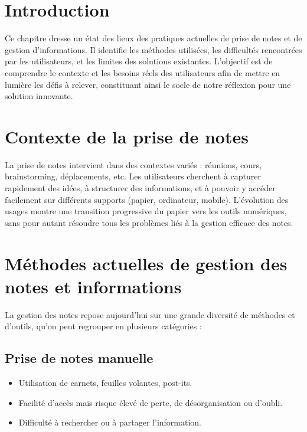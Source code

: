 
\section*{Introduction}
Ce chapitre dresse un état des lieux des pratiques actuelles de prise de notes et de gestion d’informations. Il identifie les méthodes utilisées, les difficultés rencontrées par les utilisateurs, et les limites des solutions existantes. L’objectif est de comprendre le contexte et les besoins réels des utilisateurs afin de mettre en lumière les défis à relever, constituant ainsi le socle de notre réflexion pour une solution innovante.

\section{Contexte de la prise de notes}

La prise de notes intervient dans des contextes variés : réunions, cours, brainstorming, déplacements, etc. Les utilisateurs cherchent à capturer rapidement des idées, à structurer des informations, et à pouvoir y accéder facilement sur différents supports (papier, ordinateur, mobile). L’évolution des usages montre une transition progressive du papier vers les outils numériques, sans pour autant résoudre tous les problèmes liés à la gestion efficace des notes.

\section{Méthodes actuelles de gestion des notes et informations}

La gestion des notes repose aujourd’hui sur une grande diversité de méthodes et d’outils, qu’on peut regrouper en plusieurs catégories :

\subsection{Prise de notes manuelle}
\begin{itemize}
    \item Utilisation de carnets, feuilles volantes, post-its.
    \item Facilité d’accès mais risque élevé de perte, de désorganisation ou d’oubli.
    \item Difficulté à rechercher ou à partager l’information.
\end{itemize}

